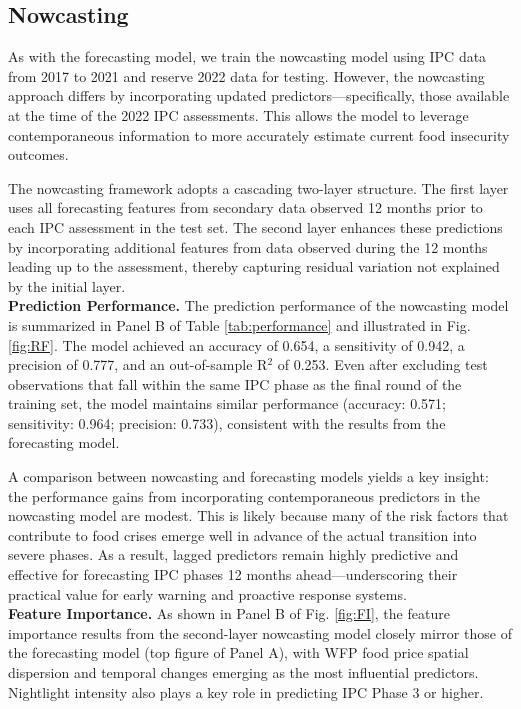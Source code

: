 \documentclass[pdflatex,sn-mathphys-num]{sn-jnl}%
\theoremstyle{thmstyleone}%
\theoremstyle{thmstyletwo}%
\theoremstyle{thmstylethree}%
\begin{document}
\subsection*{Nowcasting}
As with the forecasting model, we train the nowcasting model using IPC data from 2017 to 2021 and reserve 2022 data for testing. However, the nowcasting approach differs by incorporating updated predictors—specifically, those available at the time of the 2022 IPC assessments. This allows the model to leverage contemporaneous information to more accurately estimate current food insecurity outcomes.

The nowcasting framework adopts a cascading two-layer structure. The first layer uses all forecasting features from secondary data observed 12 months prior to each IPC assessment in the test set. The second layer enhances these predictions by incorporating additional features from data observed during the 12 months leading up to the assessment, thereby capturing residual variation not explained by the initial layer.\\

\noindent\textbf{Prediction Performance.} 
The prediction performance of the nowcasting model is summarized in Panel B of Table \ref{tab:performance} and illustrated in Fig. \ref{fig:RF}. 
The model achieved an accuracy of 0.654, a sensitivity of 0.942, a precision of 0.777, and an out-of-sample R$^{2}$ of 0.253. Even after excluding test observations that fall within the same IPC phase as the final round of the training set, the model maintains similar performance (accuracy: 0.571; sensitivity: 0.964; precision: 0.733), consistent with the results from the forecasting model. %

A comparison between nowcasting and forecasting models yields a key insight: the performance gains from incorporating contemporaneous predictors in the nowcasting model are modest. This is likely because many of the risk factors that contribute to food crises emerge well in advance of the actual transition into severe phases. As a result, lagged predictors remain highly predictive and effective for forecasting IPC phases 12 months ahead—underscoring their practical value for early warning and proactive response systems.\\

\noindent\textbf{Feature Importance.}
As shown in Panel B of Fig. \ref{fig:FI}, the feature importance results from the second-layer nowcasting model closely mirror those of the forecasting model (top figure of Panel A), with WFP food price spatial dispersion and temporal changes emerging as the most influential predictors. Nightlight intensity also plays a key role in predicting IPC Phase 3 or higher.
\end{document}
